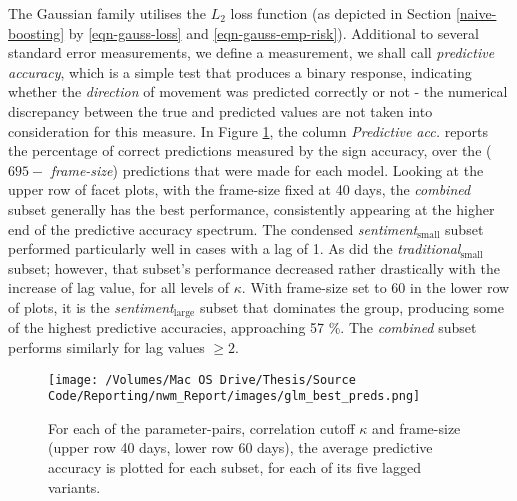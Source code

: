 \documentclass{article}
\begin{document}
The Gaussian family utilises the $L_2$ loss function (as depicted in Section \ref{naive-boosting} by \eqref{eqn-gauss-loss} and \eqref{eqn-gauss-emp-risk}). Additional to several standard error measurements, we define a measurement, we shall call \emph{predictive accuracy}, which is a simple test that produces a binary response, indicating whether the \emph{direction} of movement was predicted correctly or not - the numerical discrepancy between the true and predicted values are not taken into consideration for this measure. In Figure \ref{fig:glm-pred-acc}, the column \emph{Predictive acc.} reports the percentage of correct predictions measured by the sign accuracy, over the ($695 -$ \emph{frame-size}) predictions that were made for each model.
Looking at the upper row of facet plots, with the frame-size fixed at 40 days, the \emph{combined} subset generally has the best performance, consistently appearing at the higher end of the predictive accuracy spectrum. The condensed \emph{sentiment$_{\text{small}}$} subset performed particularly well in cases with a lag of 1. As did the \emph{traditional$_{\text{small}}$} subset; however, that subset's performance decreased rather drastically with the increase of lag value, for all levels of $\kappa$.
With frame-size set to 60 in the lower row of plots, it is the \emph{sentiment$_{\text{large}}$} subset that dominates the group, producing some of the highest predictive accuracies, approaching 57 \%. The \emph{combined} subset performs similarly for lag values $\geqslant 2$. 

\begin{figure}[htb]
\centering
\texttt{[image: /Volumes/Mac OS Drive/Thesis/Source Code/Reporting/nwm\_Report/images/glm\_best\_preds.png]}
\caption[The predictive accuracy of all subsets, using Gaussian regression in GLMs]{\label{fig:glm-pred-acc}For each of the parameter-pairs, correlation cutoff $\kappa$ and frame-size (upper row 40 days, lower row 60 days), the average predictive accuracy is plotted for each subset, for each of its five lagged variants.}
\end{figure}
\end{document}

